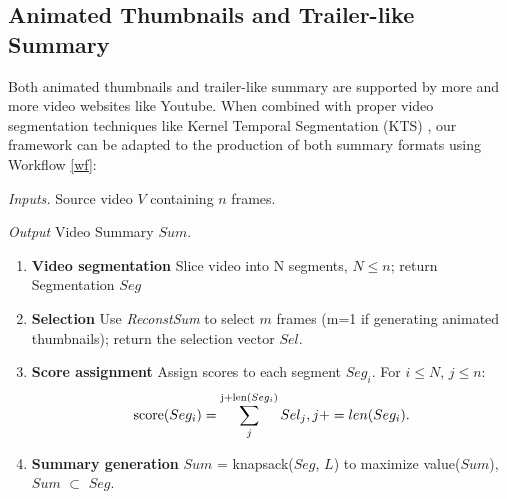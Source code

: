 \documentclass[5pt]{article}
\newcounter{Workflow}
\begin{document}
\subsection{Animated Thumbnails and Trailer-like Summary}
Both animated thumbnails and trailer-like summary are supported by more and more video websites like Youtube. When combined with proper video segmentation techniques like Kernel Temporal Segmentation (KTS)  \cite{potapov2014category}, our framework can be adapted to the production of both summary formats using Workflow \ref{wf}:
\begin{algorithm}[!ht]
\textit{Inputs.} Source video $V$ containing $n$ frames.

\textit{Output} Video Summary $Sum$.

\begin{enumerate} [topsep=0pt,itemsep=-1ex,partopsep=1ex,parsep=1ex]
	\item \textbf{Video segmentation}
    		Slice video into N segments, $N \leq n$; return Segmentation $Seg$
	\item \textbf{Selection}
		Use \textit{ReconstSum} to select $m$ frames (m=1 if generating animated thumbnails); return the selection vector $Sel$.
	\item \textbf{Score assignment}
		Assign scores to each segment $Seg_i$. For $i \leq N$, $j \leq n$:
		\begin{equation}
		\text{score}(Seg_i) = \sum_{j}^{\textnormal{j+len}(Seg_i)} Sel_j, j += len(Seg_i).
		\end{equation}
	\item \textbf{Summary generation}
		$Sum$ = knapsack($Seg$, $L$) to maximize value($Sum$),  $Sum$ $\subset$ $Seg$.
\end{enumerate}
\caption{}\label{wf}
\end{algorithm}

\end{document}
